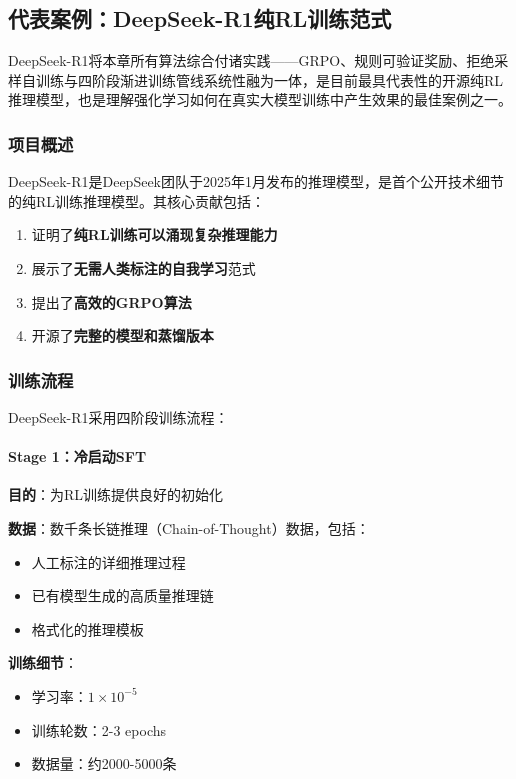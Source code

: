 \documentclass[12pt,a4paper]{article}
\begin{document}
\subsection{代表案例：DeepSeek-R1纯RL训练范式}

DeepSeek-R1将本章所有算法综合付诸实践——GRPO、规则可验证奖励、拒绝采样自训练与四阶段渐进训练管线系统性融为一体，是目前最具代表性的开源纯RL推理模型，也是理解强化学习如何在真实大模型训练中产生效果的最佳案例之一。

\subsubsection{项目概述}

DeepSeek-R1是DeepSeek团队于2025年1月发布的推理模型，是首个公开技术细节的纯RL训练推理模型。其核心贡献包括：

\begin{enumerate}
    \item 证明了\textbf{纯RL训练可以涌现复杂推理能力}
    \item 展示了\textbf{无需人类标注的自我学习}范式
    \item 提出了\textbf{高效的GRPO算法}
    \item 开源了\textbf{完整的模型和蒸馏版本}
\end{enumerate}

\subsubsection{训练流程}

DeepSeek-R1采用四阶段训练流程：

\paragraph{Stage 1：冷启动SFT}

\textbf{目的}：为RL训练提供良好的初始化

\textbf{数据}：数千条长链推理（Chain-of-Thought）数据，包括：
\begin{itemize}
    \item 人工标注的详细推理过程
    \item 已有模型生成的高质量推理链
    \item 格式化的推理模板
\end{itemize}

\textbf{训练细节}：
\begin{itemize}
    \item 学习率：$1 \times 10^{-5}$
    \item 训练轮数：2-3 epochs
    \item 数据量：约2000-5000条
\end{itemize}
\end{document}
